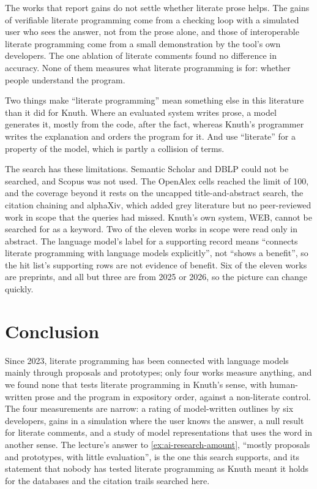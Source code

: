 The works that report gains do not settle whether literate prose helps.
The gains of verifiable literate programming come from a checking loop with a
simulated user who sees the answer, not from the prose alone, and those of
interoperable literate programming come from a small demonstration by the
tool's own developers.
The one ablation of literate comments found no difference in accuracy.
None of them measures what literate programming is for: whether people
understand the program.

Two things make \enquote{literate programming} mean something else in this
literature than it did for Knuth.
Where an evaluated system writes prose, a model generates it, mostly from the
code, after the fact, whereas Knuth's programmer writes the explanation and
orders the program for it.
And \textcite{SunStaron2026} use \enquote{literate} for a property of the
model, which is partly a collision of terms.

The search has these limitations.
Semantic Scholar and DBLP could not be searched, and Scopus was not used.
The OpenAlex cells reached the limit of 100, and the coverage beyond it rests
on the uncapped title-and-abstract search, the citation chaining and alphaXiv,
which added grey literature but no peer-reviewed work in scope that the queries
had missed.
Knuth's own system, WEB, cannot be searched for as a keyword.
Two of the eleven works in scope were read only in abstract.
The language model's label for a supporting record means \enquote{connects
literate programming with language models explicitly}, not \enquote{shows a
benefit}, so the hit list's supporting rows are not evidence of benefit.
Six of the eleven works are preprints, and all but three are from 2025 or 2026,
so the picture can change quickly.

\section{Conclusion}
\label{sec:ai-rq1-conclusion}

Since 2023, literate programming has been connected with language models mainly
through proposals and prototypes; only four works measure anything, and we
found none that tests literate programming in Knuth's sense, with human-written
prose and the program in expository order, against a non-literate control.
The four measurements are narrow: a rating of model-written outlines by six
developers, gains in a simulation where the user knows the answer, a null
result for literate comments, and a study of model representations that uses
the word in another sense.
The lecture's answer to \cref{ex:ai-research-amount}, \enquote{mostly proposals
and prototypes, with little evaluation}, is the one this search supports, and
its statement that nobody has tested literate programming as Knuth meant it
holds for the databases and the citation trails searched here.

